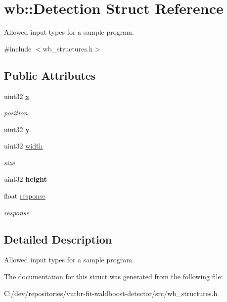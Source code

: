 \hypertarget{structwb_1_1_detection}{}\section{wb\+:\+:Detection Struct Reference}
\label{structwb_1_1_detection}


Allowed input types for a sample program.  




{\ttfamily \#include $<$wb\+\_\+structures.\+h$>$}

\subsection*{Public Attributes}
\begin{DoxyCompactItemize}
\item 
\hypertarget{structwb_1_1_detection_acef36bb494f55b5e267be048c61740e8}{}uint32 \hyperlink{structwb_1_1_detection_acef36bb494f55b5e267be048c61740e8}{x}\label{structwb_1_1_detection_acef36bb494f55b5e267be048c61740e8}

\begin{DoxyCompactList}\small\item\em position \end{DoxyCompactList}\item 
\hypertarget{structwb_1_1_detection_a73b025a1e632ba4fbea5776afafe8fe1}{}uint32 {\bfseries y}\label{structwb_1_1_detection_a73b025a1e632ba4fbea5776afafe8fe1}

\item 
\hypertarget{structwb_1_1_detection_a0908dbf2256d884d5605752e20eb2d7a}{}uint32 \hyperlink{structwb_1_1_detection_a0908dbf2256d884d5605752e20eb2d7a}{width}\label{structwb_1_1_detection_a0908dbf2256d884d5605752e20eb2d7a}

\begin{DoxyCompactList}\small\item\em size \end{DoxyCompactList}\item 
\hypertarget{structwb_1_1_detection_afc0c36c603466a4249ed84fdf77859dc}{}uint32 {\bfseries height}\label{structwb_1_1_detection_afc0c36c603466a4249ed84fdf77859dc}

\item 
\hypertarget{structwb_1_1_detection_ae5d2ccff9e2911cb57c629a4b45fecb7}{}float \hyperlink{structwb_1_1_detection_ae5d2ccff9e2911cb57c629a4b45fecb7}{response}\label{structwb_1_1_detection_ae5d2ccff9e2911cb57c629a4b45fecb7}

\begin{DoxyCompactList}\small\item\em response \end{DoxyCompactList}\end{DoxyCompactItemize}


\subsection{Detailed Description}
Allowed input types for a sample program. 

The documentation for this struct was generated from the following file\+:\begin{DoxyCompactItemize}
\item 
C\+:/dev/repositories/vutbr-\/fit-\/waldboost-\/detector/src/wb\+\_\+structures.\+h\end{DoxyCompactItemize}
